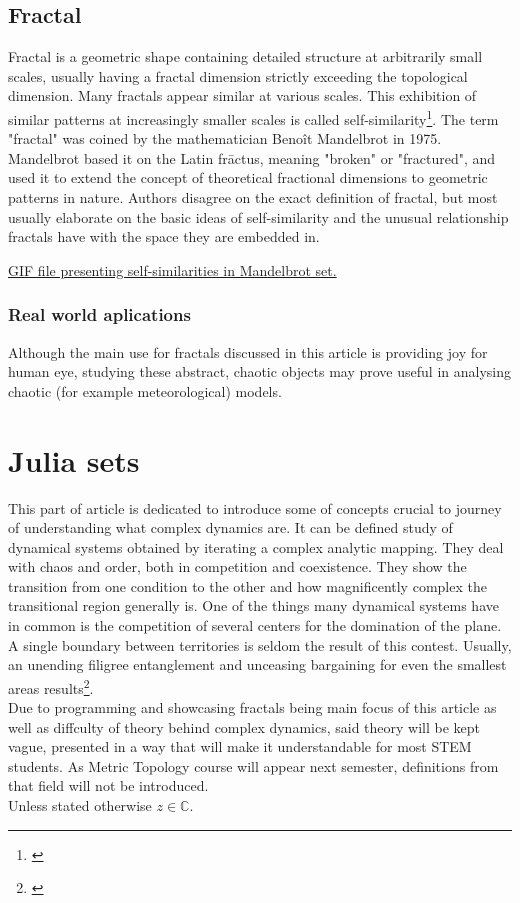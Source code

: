\documentclass{article}
\begin{document}
\subsection{Fractal}
Fractal is a geometric shape containing detailed structure at arbitrarily small scales, usually having a fractal dimension strictly exceeding the topological dimension. Many fractals appear similar at various scales. This exhibition of similar patterns at increasingly smaller scales is called self-similarity\footnote{\cite{BenoitB.Mandelbrot1983}}.
The term "fractal" was coined by the mathematician Benoît Mandelbrot in 1975. Mandelbrot based it on the Latin frāctus, meaning "broken" or "fractured", and used it to extend the concept of theoretical fractional dimensions to geometric patterns in nature.
Authors disagree on the exact definition of fractal, but most usually elaborate on the basic ideas of self-similarity and the unusual relationship fractals have with the space they are embedded in.
\begin{center}
	\footnotesize
	\href{run:Utils/article_dependencies/graphic_4.gif}{GIF file presenting self-similarities in Mandelbrot set.}
\end{center}

\subsubsection{Real world aplications}
Although the main use for fractals discussed in this article is providing joy for human eye, studying these abstract, chaotic objects may prove useful in analysing chaotic (for example meteorological) models.

\newpage
\section{Julia sets}
This part of article is dedicated to introduce some of concepts crucial to journey of understanding what complex dynamics are. It can be defined study of dynamical systems obtained by iterating a complex analytic mapping. They deal with chaos and order, both in competition and coexistence. They show the transition from one condition to the other and how magnificently complex the transitional region generally is. One of the things many dynamical systems have in common is the competition of several centers for the domination of the plane. A single boundary between territories is seldom the result of this contest. Usually, an unending filigree entanglement and unceasing bargaining for even the smallest areas results\footnote{\cite{Heinz-OttoPeitgen2004}}. %
\\[1\baselineskip]
 Due to programming and showcasing fractals being main focus of this article as well as diffculty of theory behind complex dynamics, said theory will be kept vague, presented in a way that will make it understandable for most STEM students. As Metric Topology course will appear next semester, definitions from that field will not be introduced. \\Unless stated otherwise $z\in\mathbb{C}$.
\end{document}
